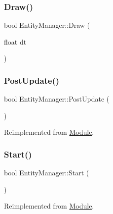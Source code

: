\subsubsection{\texorpdfstring{Draw()}{Draw()}}
{\footnotesize\ttfamily bool Entity\+Manager\+::\+Draw (\begin{DoxyParamCaption}\item[{float}]{dt }\end{DoxyParamCaption})}

\mbox{\label{class_entity_manager_a1ad9ecfb4c966a1b399146d5a9209425}} 
\subsubsection{\texorpdfstring{PostUpdate()}{PostUpdate()}}
{\footnotesize\ttfamily bool Entity\+Manager\+::\+Post\+Update (\begin{DoxyParamCaption}{ }\end{DoxyParamCaption})\hspace{0.3cm}{\ttfamily [virtual]}}



Reimplemented from \mbox{\hyperlink{class_module_afc355df351a4483850c3f512823ceebd}{Module}}.

\mbox{\label{class_entity_manager_ac2cdeaf31edc0c79e0a05f4da05d5351}} 
\subsubsection{\texorpdfstring{Start()}{Start()}}
{\footnotesize\ttfamily bool Entity\+Manager\+::\+Start (\begin{DoxyParamCaption}{ }\end{DoxyParamCaption})\hspace{0.3cm}{\ttfamily [virtual]}}



Reimplemented from \mbox{\hyperlink{class_module_aaf67046743296e8de310039a1dc95d86}{Module}}.

\mbox{\label{class_entity_manager_ab86bf1458923878536cf87792ded0a9b}} 
